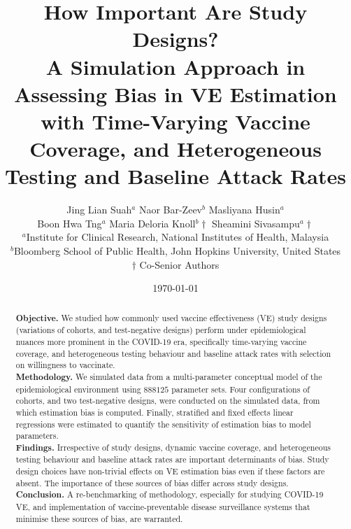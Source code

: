 \documentclass[12pt]{article}
\title{\textbf{How Important Are Study Designs?} \\ A Simulation Approach in Assessing Bias in VE Estimation with Time-Varying Vaccine Coverage, and Heterogeneous Testing and Baseline Attack Rates}
\author{Jing Lian Suah${}^a$ \qquad Naor Bar-Zeev${}^b$ \qquad Masliyana Husin${}^a$ \\ Boon Hwa Tng${}^a$ \qquad Maria Deloria Knoll${}^b\dagger$ \qquad Sheamini Sivasampu${}^a\dagger$ \\ \small ${}^a$Institute for Clinical Research, National Institutes of Health, Malaysia \\ \small ${}^b$Bloomberg School of Public Health, John Hopkins University, United States \\ \small $\dagger$ Co-Senior Authors}
\date{\today}
\begin{document}
\begin{titlepage}
	\maketitle
	\begin{abstract}
		\noindent
		\textbf{Objective.} We studied how commonly used vaccine effectiveness (VE) study designs (variations of cohorts, and test-negative designs) perform under epidemiological nuances more prominent in the COVID-19 era, specifically time-varying vaccine coverage, and heterogeneous testing behaviour and baseline attack rates with selection on willingness to vaccinate.\\
		\textbf{Methodology.} We simulated data from a multi-parameter conceptual model of the epidemiological environment using $888125$ parameter sets. Four configurations of cohorts, and two test-negative designs, were conducted on the simulated data, from which estimation bias is computed. Finally, stratified and fixed effects linear regressions were estimated to quantify the sensitivity of estimation bias to model parameters.\\
		\textbf{Findings.} Irrespective of study designs, dynamic vaccine coverage, and heterogeneous testing behaviour and baseline attack rates are important determinants of bias. Study design choices have non-trivial effects on VE estimation bias even if these factors are absent. The importance of these sources of bias differ across study designs. \\
		\textbf{Conclusion.} A re-benchmarking of methodology, especially for studying COVID-19 VE, and implementation of vaccine-preventable disease surveillance systems that minimise these sources of bias, are warranted.
	\end{abstract}
\end{titlepage}
\end{document}
